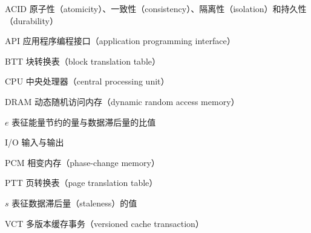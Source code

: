 \begin{denotation}
\item[ACID] 原子性（atomicity）、一致性（consistency）、隔离性（isolation）和持久性（durability）
\item[API] 应用程序编程接口（application programming interface）
\item[BTT] 块转换表（block translation table）
\item[CPU] 中央处理器（central processing unit）
\item[DRAM] 动态随机访问内存（dynamic random access memory）
\item[$e$] 表征能量节约的量与数据滞后量的比值
\item[I/O] 输入与输出
\item[PCM] 相变内存（phase-change memory）
\item[PTT] 页转换表（page translation table）
\item[$s$] 表征数据滞后量（staleness）的值
\item[VCT] 多版本缓存事务（versioned cache transaction）
\end{denotation}
